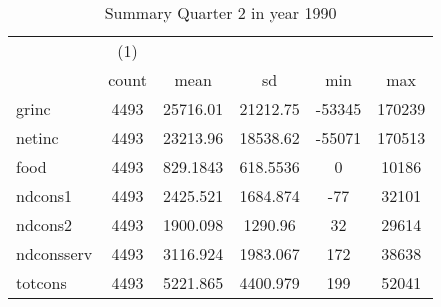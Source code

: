 \begin{table}[htbp]\centering
\def\sym#1{\ifmmode^{#1}\else\(^{#1}\)\fi}
\caption{Summary Quarter 2 in year 1990 \label{sum\_Q2\_y1990}}
\begin{tabular}{l*{1}{ccccc}}
\hline\hline
            &\multicolumn{1}{c}{(1)}&            &            &            &            \\
            &       count&        mean&          sd&         min&         max\\
\hline
grinc       &        4493&    25716.01&    21212.75&      -53345&      170239\\
netinc      &        4493&    23213.96&    18538.62&      -55071&      170513\\
food        &        4493&    829.1843&    618.5536&           0&       10186\\
ndcons1     &        4493&    2425.521&    1684.874&         -77&       32101\\
ndcons2     &        4493&    1900.098&     1290.96&          32&       29614\\
ndconsserv  &        4493&    3116.924&    1983.067&         172&       38638\\
totcons     &        4493&    5221.865&    4400.979&         199&       52041\\
\hline\hline
\end{tabular}
\end{table}

